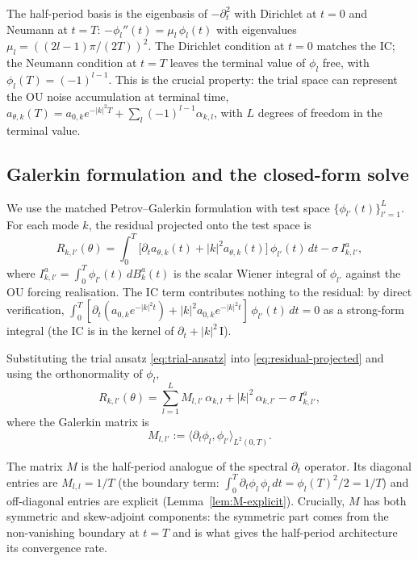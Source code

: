 The half-period basis is the eigenbasis of $-\partial_t^2$ with
Dirichlet at $t = 0$ and Neumann at $t = T$:
$-\phi_l''(t) = \mu_l\,\phi_l(t)$ with eigenvalues
$\mu_l = ((2l-1)\pi/(2T))^2$. The Dirichlet condition at $t = 0$
matches the IC; the Neumann condition at $t = T$ leaves the terminal
value of $\phi_l$ free, with $\phi_l(T) = (-1)^{l-1}$. This is the
crucial property: the trial space can represent the OU noise
accumulation at terminal time, $a_{\theta, k}(T) = a_{0, k}e^{-|k|^2 T}
+ \sum_l (-1)^{l-1}\alpha_{k, l}$, with $L$ degrees of freedom in the
terminal value.

\subsection{Galerkin formulation and the closed-form solve}
\label{sec:method:galerkin}

We use the matched Petrov--Galerkin formulation with test space
$\{\phi_{l'}(t)\}_{l' = 1}^L$. For each mode $k$, the residual
projected onto the test space is
\begin{equation}
R_{k, l'}(\theta) = \int_0^T \!\bigl[\partial_t a_{\theta, k}(t)
+ |k|^2 a_{\theta, k}(t)\bigr]\,\phi_{l'}(t)\, dt
- \sigma\,I_{k, l'}^a,
\label{eq:residual-projected}
\end{equation}
where $I_{k, l'}^a = \int_0^T \phi_{l'}(t)\, dB_k^a(t)$ is the
scalar Wiener integral of $\phi_{l'}$ against the OU forcing
realisation. The IC term contributes nothing to the residual: by direct
verification, $\int_0^T [\partial_t(a_{0,k}e^{-|k|^2 t}) + |k|^2
a_{0,k}e^{-|k|^2 t}]\,\phi_{l'}(t)\, dt = 0$ as a strong-form integral
(the IC is in the kernel of $\partial_t + |k|^2\,\mathrm{I}$).

Substituting the trial ansatz \eqref{eq:trial-ansatz} into
\eqref{eq:residual-projected} and using the orthonormality of $\phi_l$,
\begin{equation}
R_{k, l'}(\theta) = \sum_{l = 1}^L M_{l, l'}\,\alpha_{k, l}
+ |k|^2\,\alpha_{k, l'} - \sigma\,I_{k, l'}^a,
\label{eq:residual-galerkin}
\end{equation}
where the Galerkin matrix is
\begin{equation}
M_{l, l'} := \langle \partial_t \phi_l, \phi_{l'} \rangle_{L^2(0, T)}.
\label{eq:M-matrix}
\end{equation}

The matrix $M$ is the half-period analogue of the spectral
$\partial_t$ operator. Its diagonal entries are $M_{l, l} = 1/T$
(the boundary term: $\int_0^T \partial_t\phi_l\,\phi_l\,dt
= \phi_l(T)^2/2 = 1/T$) and off-diagonal entries are explicit
(Lemma~\ref{lem:M-explicit}). Crucially, $M$ has both symmetric and
skew-adjoint components: the symmetric part comes from the
non-vanishing boundary at $t = T$ and is what gives the half-period
architecture its convergence rate.

